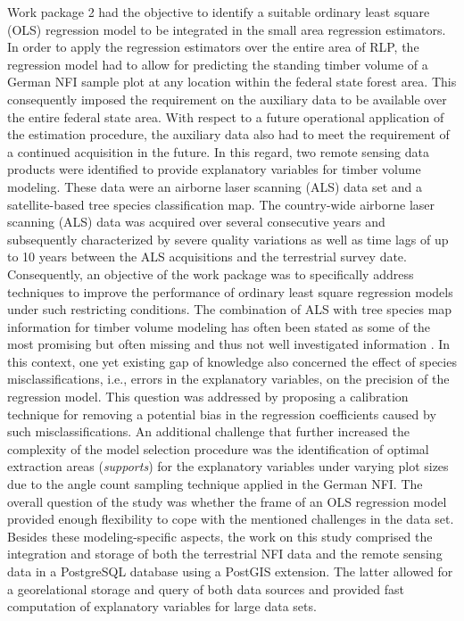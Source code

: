 Work package 2 had the objective to identify a suitable ordinary least square (OLS) regression model to be integrated in the small area regression estimators. In order to apply the regression estimators over the entire area of RLP, the regression model had to allow for predicting the standing timber volume of a German NFI sample plot at any location within the federal state forest area. This consequently imposed the requirement on the auxiliary data to be available over the entire federal state area. With respect to a future operational application of the estimation procedure, the auxiliary data also had to meet the requirement of a continued acquisition in the future. In this regard, two remote sensing data products were identified to provide explanatory variables for timber volume modeling. These data were an airborne laser scanning (ALS) data set and a satellite-based tree species classification map. The country-wide airborne laser scanning (ALS) data was acquired over several consecutive years and subsequently characterized by severe quality variations as well as time lags of up to 10 years between the ALS acquisitions and the terrestrial survey date. Consequently, an objective of the work package was to specifically address techniques to improve the performance of ordinary least square regression models under such restricting conditions. The combination of ALS with tree species map information for timber volume modeling has often been stated as some of the most promising but often missing and thus not well investigated information \citep{koch2010, white2016}. In this context, one yet existing gap of knowledge also concerned the effect of species misclassifications, i.e., errors in the explanatory variables, on the precision of the regression model. This question was addressed by proposing a calibration technique for removing a potential bias in the regression coefficients caused by such misclassifications. An additional challenge that further increased the complexity of the model selection procedure was the identification of optimal extraction areas (\textit{supports}) for the explanatory variables under varying plot sizes due to the angle count sampling technique applied in the German NFI. The overall question of the study was whether the frame of an OLS regression model provided enough flexibility to cope with the mentioned challenges in the data set. Besides these modeling-specific aspects, the work on this study comprised the integration and storage of both the terrestrial NFI data and the remote sensing data in a PostgreSQL database using a PostGIS extension. The latter allowed for a georelational storage and query of both data sources and provided fast computation of explanatory variables for large data sets.

